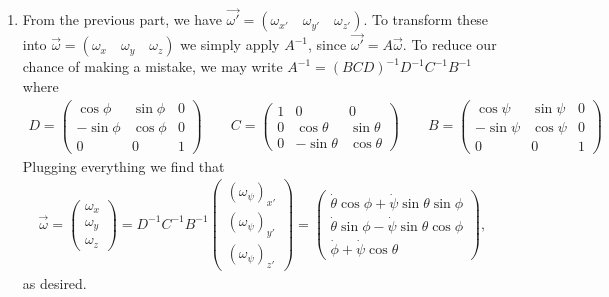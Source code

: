 \documentclass{article}
\theoremstyle{definition}
\begin{document}
\begin{enumerate}[label=(\alph*)]
	
	\item From the previous part, we have $\vec{\omega'} = (\omega_{x'} \quad \omega_{y'} \quad \omega_{z'})$. To transform these into $\vec{\omega} = (\omega_{x} \quad \omega_{y} \quad \omega_{z})$ we simply apply $A^{-1}$, since $\vec{\omega'} = A \vec{\omega}$. To reduce our chance of making a mistake, we may write $A^{-1} = (BCD)^{-1}  D^{-1}C^{-1} B^{-1}$ where
	\begin{align*}
	D = \begin{pmatrix}
	\cos\phi & \sin\phi & 0\\
	-\sin\phi & \cos\phi & 0\\
	0 &0 & 1
	\end{pmatrix} \quad\quad 
	C= \begin{pmatrix}
	1 & 0 & 0 \\
	0 & \cos\theta&\sin\theta \\
	0 & -\sin\theta  & \cos\theta
	\end{pmatrix}
	\quad\quad
	B = \begin{pmatrix}
	\cos\psi & \sin\psi & 0 \\
	-\sin\psi & \cos\psi & 0 \\
	0 & 0 & 1
	\end{pmatrix}
	\end{align*} 
	Plugging everything we find that 
	\begin{align*}
	\vec{\omega} = \begin{pmatrix}
	\omega_x \\ \omega_y \\ \omega_z 
	\end{pmatrix}
	= 
	D^{-1}C^{-1} B^{-1}
	\begin{pmatrix}
	(\omega_\psi)_{x'} \\
	(\omega_\psi)_{y'} \\
	(\omega_\psi)_{z'} 
	\end{pmatrix} = 
	\begin{pmatrix}
	\dot\theta \cos\phi + \dot\psi \sin\theta\sin\phi  \\ 
	\dot\theta \sin\phi - \dot\psi \sin\theta\cos\phi  \\ 
	\dot\phi + \dot\psi \cos\theta 
	\end{pmatrix},
	\end{align*}
	as desired.
	

\end{enumerate}
\end{document}
